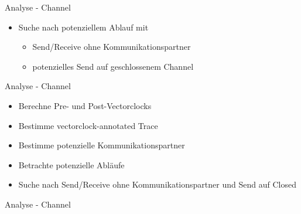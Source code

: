 \documentclass[aspectratio=169]{beamer}  %
\begin{document}
\begin{frame}{Analyse - Channel}
  \begin{itemize}
    \item Suche nach potenziellem Ablauf mit 
    \begin{itemize}
      \item Send/Receive ohne Kommunikationspartner
      \item potenzielles Send auf geschlossenem Channel
    \end{itemize} 
  \end{itemize}
\end{frame}

\begin{frame}{Analyse - Channel}
  \begin{itemize}
    \item Berechne Pre- und Post-Vectorclocks
    \item Bestimme vectorclock-annotated Trace
    \item Bestimme potenzielle Kommunikationspartner
    \item Betrachte potenzielle Abläufe 
    \item Suche nach Send/Receive ohne Kommunikationspartner und Send auf Closed
  \end{itemize}
\end{frame}

\begin{frame}{Analyse - Channel}
    
\end{frame}


\end{document}
